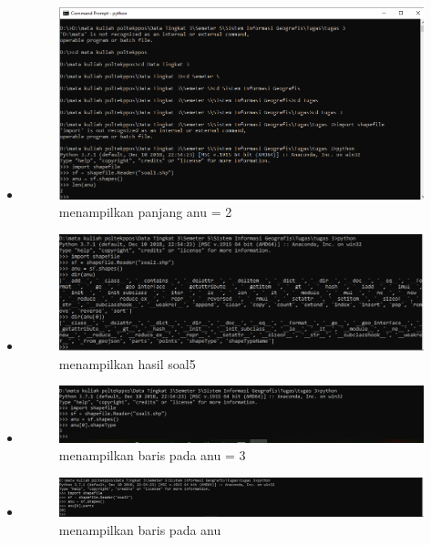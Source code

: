 \begin{itemize}
	\item 
	\begin{figure}[H]
		\includegraphics[width=12cm]{figures/1174039/tugas 3/hasilno4.PNG}
		\centering
		\caption{menampilkan panjang anu = 2}
	\end{figure}
	
	\item 
	\begin{figure}[H]
		\includegraphics[width=12cm]{figures/1174039/tugas 3/hasilno5.PNG}
		\centering
		\caption{menampilkan hasil soal5}
	\end{figure}
	
	\item 
	\begin{figure}[H]
		\includegraphics[width=12cm]{figures/1174039/tugas 3/hasilno6.PNG}
		\centering
		\caption{menampilkan baris pada anu = 3}
	\end{figure}
	
	\item 
	\begin{figure}[H]
		\includegraphics[width=12cm]{figures/1174039/tugas 3/hasilno7.PNG}
		\centering
		\caption{menampilkan baris pada anu}
	\end{figure}
	

\end{itemize}
